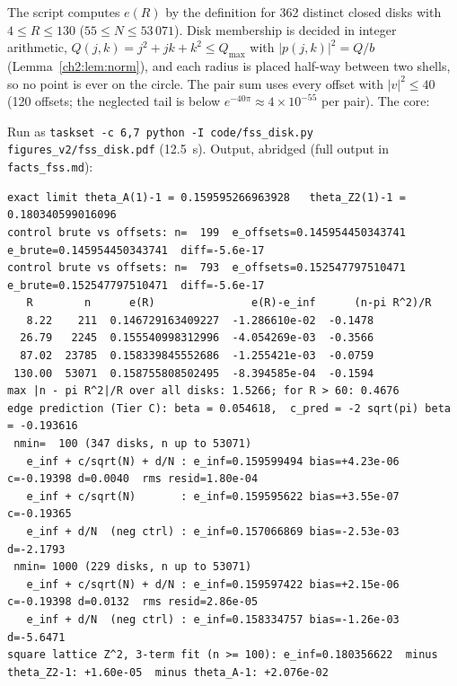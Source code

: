 \begin{numbox}
\tierX{} The script computes $e(R)$ by the definition for 362 distinct closed disks with $4\le R\le130$ ($55\le N\le
53\,071$). Disk membership is decided in integer arithmetic, $Q(j,k)=j^2+jk+k^2\le Q_{\max}$ with
$|p(j,k)|^2=Q/b$ (Lemma~\ref{ch2:lem:norm}), and each radius is placed half-way between two shells, so no point is ever
on the circle. The pair sum uses every offset with $|v|^2\le40$ (120 offsets; the neglected tail is below
$e^{-40\pi}\approx4\times10^{-55}$ per pair). The core:

Run as \texttt{taskset -c 6,7 python -I code/fss\_disk.py figures\_v2/fss\_disk.pdf} (12.5~s). Output, abridged
(full output in \texttt{facts\_fss.md}):
\begin{lstlisting}[language={},basicstyle=\ttfamily\tiny,title={fss\_disk.py (abridged)}]
exact limit theta_A(1)-1 = 0.159595266963928   theta_Z2(1)-1 = 0.180340599016096
control brute vs offsets: n=  199  e_offsets=0.145954450343741  e_brute=0.145954450343741  diff=-5.6e-17
control brute vs offsets: n=  793  e_offsets=0.152547797510471  e_brute=0.152547797510471  diff=-5.6e-17
   R        n      e(R)               e(R)-e_inf      (n-pi R^2)/R
   8.22    211  0.146729163409227  -1.286610e-02  -0.1478
  26.79   2245  0.155540998312996  -4.054269e-03  -0.3566
  87.02  23785  0.158339845552686  -1.255421e-03  -0.0759
 130.00  53071  0.158755808502495  -8.394585e-04  -0.1594
max |n - pi R^2|/R over all disks: 1.5266; for R > 60: 0.4676
edge prediction (Tier C): beta = 0.054618,  c_pred = -2 sqrt(pi) beta = -0.193616
 nmin=  100 (347 disks, n up to 53071)
   e_inf + c/sqrt(N) + d/N : e_inf=0.159599494 bias=+4.23e-06 c=-0.19398 d=0.0040  rms resid=1.80e-04
   e_inf + c/sqrt(N)       : e_inf=0.159595622 bias=+3.55e-07 c=-0.19365
   e_inf + d/N  (neg ctrl) : e_inf=0.157066869 bias=-2.53e-03 d=-2.1793
 nmin= 1000 (229 disks, n up to 53071)
   e_inf + c/sqrt(N) + d/N : e_inf=0.159597422 bias=+2.15e-06 c=-0.19398 d=0.0132  rms resid=2.86e-05
   e_inf + d/N  (neg ctrl) : e_inf=0.158334757 bias=-1.26e-03 d=-5.6471
square lattice Z^2, 3-term fit (n >= 100): e_inf=0.180356622  minus theta_Z2-1: +1.60e-05  minus theta_A-1: +2.076e-02
\end{lstlisting}
\end{numbox}


